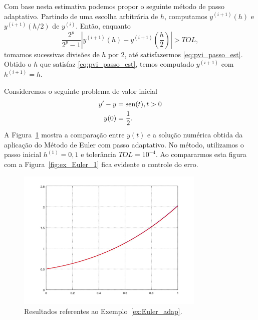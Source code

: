 Com base nesta estimativa podemos propor o seguinte método de passo adaptativo. Partindo de uma escolha arbitrária de $h$, computamos $y^{(i+1)}(h)$ e $y^{(i+1)}(h/2)$ de  $y^{(i)}$. Então, enquanto
\begin{equation}
  \frac{2^p}{2^p-1}\left|y^{(i+1)}(h) - y^{(i+1)}\left(\frac{h}{2}\right)\right| > TOL,
\end{equation}
tomamos sucessivas divisões de $h$ por $2$, até satisfazermos \eqref{eq:pvi_passo_est}. Obtido o $h$ que satisfaz \eqref{eq:pvi_passo_est}, temos computado $y^{(i+1)}$ com $h^{(i+1)}=h$.

\begin{ex}\label{ex:Euler_adap}
  Consideremos o seguinte problema de valor inicial
  \begin{align}
    y' - y &= \operatorname{sen}(t), t>0\\
    y(0) &= \frac{1}{2}.
  \end{align}
  A Figura~\ref{fig:ex_Euler_adap} mostra a comparação entre $y(t)$ e a solução numérica obtida da aplicação do Método de Euler com passo adaptativo. No método, utilizamos o passo inicial $h^{(1)}=0,1$ e tolerância $TOL=10^{-4}$. Ao compararmos esta figura com a Figura~\eqref{fig:ex_Euler_1} fica evidente o controle do erro.

  \begin{figure}[h!]
    \centering
    \includegraphics[width=0.8\textwidth]{./cap_pvi/dados/ex_Euler_adap/ex_Euler_adap}
    \caption{Resultados referentes ao Exemplo~\ref{ex:Euler_adap}.}
    \label{fig:ex_Euler_adap}
  \end{figure}



\end{ex}
